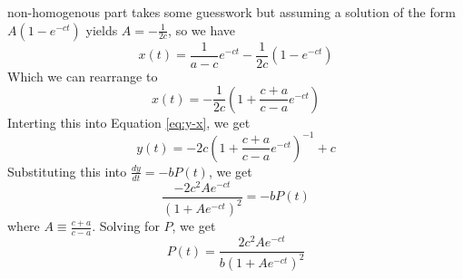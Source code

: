 \documentclass[11pt,addpoints,answers]{exam}
\begin{document}
\begin{questions}
                    non-homogenous part takes some guesswork but assuming
                    a solution of the form $A(1-e^{-ct})$ yields
                    $A=-\frac{1}{2c}$, so we have
                    \[
                        x(t) = \frac{1}{a-c}e^{-ct} - \frac{1}{2c}(1-e^{-ct}) 
                    \]
                    Which we can rearrange to
                    \[
                        x(t) = -\frac{1}{2c}(1+\frac{c+a}{c-a}e^{-ct}) 
                    \]
                    Interting this into Equation \ref{eq:y-x}, we get
                    \[
                        y(t) = -2c(1 + \frac{c+a}{c-a}e^{-ct})^{-1} + c
                    \]
                    Substituting this into $\frac{dy}{dt} = -bP(t)$, we get
                    \[
                        \frac{-2c^{2}Ae^{-ct}}{(1+Ae^{-ct})^{2}} = -bP(t)
                    \]
                    where $A\equiv \frac{c+a}{c-a}$. Solving for $P$, we get
                    \[
                        P(t) = \frac{2c^{2}Ae^{-ct}}{b(1+Ae^{-ct})^{2}}
                    \]
\end{questions}



%
%
\end{document}
